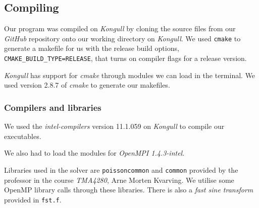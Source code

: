 \subsection{Compiling} %
\label{sub:compiling}
Our program was compiled on \emph{Kongull} by cloning the source files from our \emph{GitHub} repository onto our working directory on \emph{Kongull}. We used \texttt{cmake} to generate a makefile for us with the release build options, \texttt{CMAKE\_BUILD\_TYPE=RELEASE}, that turns on compiler flags for a release version.

\emph{Kongull} has support for \emph{cmake} through modules we can load in the terminal. We used version 2.8.7 of \emph{cmake} to generate our makefiles.

\subsubsection{Compilers and libraries} %
\label{ssub:compilers}
We used the \emph{intel-compilers} version 11.1.059 on \emph{Kongull} to compile our executables.

We also had to load the modules for \emph{OpenMPI 1.4.3-intel}.

Libraries used in the solver are \texttt{poissoncommon} and \texttt{common} provided by the professor in the course \emph{TMA4280}, Arne Morten Kvarving. We utilise some OpenMP library calls through these libraries. There is also a \emph{fast sine transform} provided in \texttt{fst.f}.




